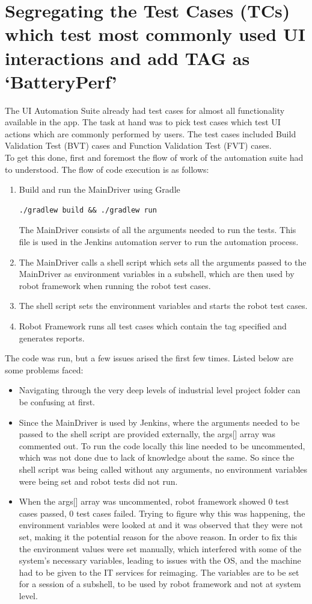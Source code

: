 \section{Segregating the Test Cases (TCs) which test most commonly used UI interactions and add TAG as `BatteryPerf'} The UI Automation Suite already had test cases for almost all functionality available in the app. The task at hand was to pick test cases which test UI actions which are commonly performed by users. The test cases included Build Validation Test (BVT) cases and Function Validation Test (FVT) cases.  \\
To get this done, first and foremost the flow of work of the automation suite  had to understood. The flow of code execution is as follows: 
\begin{enumerate}
	\item Build and run the MainDriver using Gradle
	\begin{lstlisting}[style=ShellStyle]
	./gradlew build && ./gradlew run
	\end{lstlisting}
	The MainDriver consists of all the arguments needed to run the tests. This file is used in the Jenkins automation server to run the automation process.
	\item The MainDriver calls a shell script which sets all the arguments passed to the MainDriver as environment variables in a subshell, which are then used by robot framework when running the robot test cases.
	\item The shell script sets the environment variables and starts the robot test cases.
	\item Robot Framework runs all test cases which contain the tag specified and generates reports.
\end{enumerate}
The code was run, but a few issues arised the first few times. Listed below are some problems faced:
\begin{itemize}
	\item Navigating through the very deep levels of industrial level project folder can be confusing at first.
	\item Since the MainDriver is used by Jenkins, where the arguments needed to be passed to the shell script are provided externally, the args[] array was commented out. To run the code locally this line needed to be uncommented, which was not done due to lack of knowledge about the same. So since the shell script was being called without any arguments, no environment variables were being set and robot tests did not run.
	\item When the args[] array was uncommented, robot framework showed 0 test cases passed, 0 test cases failed. Trying to figure why this was happening, the environment variables were looked at and it was observed that they were not set, making it the potential reason for the above reason. In order to fix this the environment values were set manually, which interfered with some of the system's necessary variables, leading to issues with the OS, and the machine had to be given to the IT services for reimaging. The variables are to be set for a session of a subshell, to be used by robot framework and not at system level.
\end{itemize}

